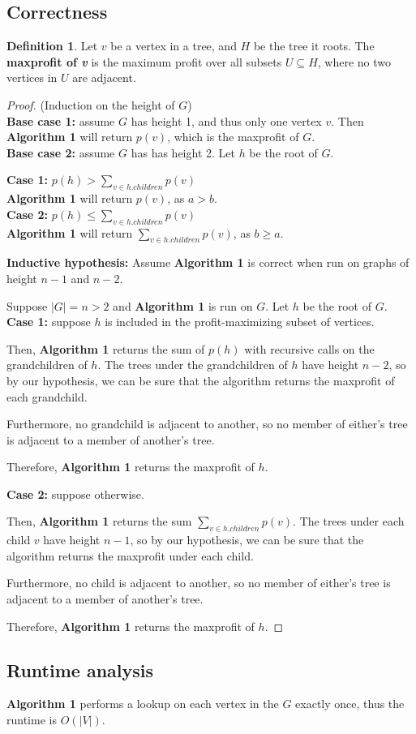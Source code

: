 \documentclass[11pt]{article}
\theoremstyle{plain}
\theoremstyle{definition}
\newtheorem*{defn}{Definition}
\begin{document}
\subsection{Correctness}

\begin{defn}
    Let $v$ be a vertex in a tree, and $H$ be the tree it roots. 
    The \textbf{maxprofit of \textit{v}} is the maximum profit over all subsets $U \subseteq H$, 
    where no two vertices in $U$ are adjacent.
\end{defn}

\begin{proof} (Induction on the height of $G$)\\
    \textbf{Base case 1:} assume $G$ has height 1, and thus only one vertex $v$. 
    Then \textbf{Algorithm 1} will return $p(v)$, which is the maxprofit of $G$.\\
    \noindent\textbf{Base case 2:} assume $G$ has has height 2. Let $h$ be the root of $G$.
    
    \indent\textbf{Case 1:} $p(h) > \sum_{v \in h.children} p(v)$\\
    \indent\indent\textbf{Algorithm 1} will return $p(v)$, as $a > b$.\\
    \indent\textbf{Case 2:} $p(h) \leq \sum_{v \in h.children} p(v)$\\
    \indent\indent\textbf{Algorithm 1} will return $\sum_{v \in h.children} p(v)$, as $b \geq a$.
    \bigbreak

    \noindent\textbf{Inductive hypothesis:} Assume \textbf{Algorithm 1} is correct when run on graphs
    of height $n - 1$ and $n - 2$.
    \bigbreak
    
    \noindent Suppose $|G| = n > 2$ and \textbf{Algorithm 1} is run on $G$. Let $h$ be the root of $G$.
    \bigbreak
    \indent\textbf{Case 1:} suppose $h$ is included in the profit-maximizing subset of
    vertices. 

    Then, \textbf{Algorithm 1} returns the sum of $p(h)$ with recursive calls on the grandchildren of $h$.
    The trees under the grandchildren of $h$ have height $n - 2$, so by our hypothesis, we can be 
    sure that the algorithm returns the maxprofit of each grandchild.  

    Furthermore, no grandchild is adjacent to another, so no member of either's tree is adjacent to 
    a member of another's tree.

    Therefore, \textbf{Algorithm 1} returns the maxprofit of $h$.
    \bigbreak

    \indent\textbf{Case 2:} suppose otherwise.

    Then, \textbf{Algorithm 1} returns the sum $\sum_{v \in h.children} p(v)$. The trees under each 
    child $v$ have height $n - 1$, so by our hypothesis, we can be sure that the algorithm returns 
    the maxprofit under each child. 

    Furthermore, no child is adjacent to another, so no member of either's tree is adjacent to 
    a member of another's tree.

    Therefore, \textbf{Algorithm 1} returns the maxprofit of $h$.
\end{proof}

\subsection{Runtime analysis}

\textbf{Algorithm 1} performs a lookup on each vertex in the $G$ exactly once, thus the runtime
is $O(|V|)$.
\end{document}
